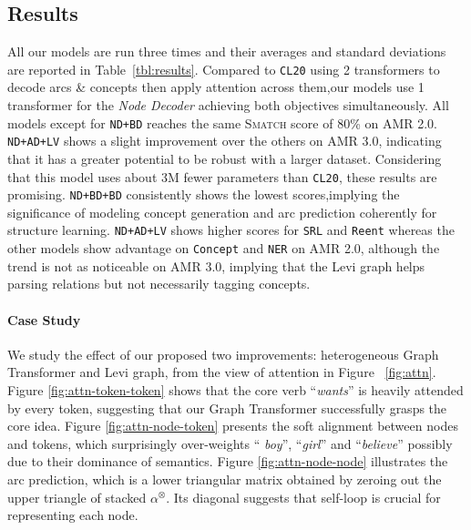 \documentclass[11pt,a4paper]{article}
\newcommand{\LN}{\linebreak\noindent}    \newcommand{\textsec}[1]{\textsection\ref{#1}}
\begin{document}
\subsection{Results}



All our models are run three times and their averages and standard deviations are reported in Table~\ref{tbl:results}.
Compared to \texttt{CL20} using 2 transformers to decode arcs \& concepts then apply attention across them,\LN our models use 1 transformer for the \textit{Node Decoder} achieving both objectives simultaneously.
All models except for \texttt{ND+BD} reaches the same \textsc{Smatch} score of 80\% on AMR 2.0.
\texttt{ND+AD+LV} shows a slight improvement over the others on AMR 3.0, indicating that it has a greater potential to be robust with a larger dataset.
Considering that this model uses about 3M fewer parameters than \texttt{CL20}, these results are promising.
\texttt{ND+BD+BD} consistently shows the lowest scores,\LN implying the significance of modeling concept generation and arc prediction coherently for structure learning.
\texttt{ND+AD+LV} shows higher scores for \texttt{SRL} and \texttt{Reent} whereas the other models show advantage on \texttt{Concept} and \texttt{NER} on AMR 2.0, although the trend is not as noticeable on AMR 3.0, implying that the Levi graph helps parsing relations but not necessarily tagging concepts.






\paragraph{Case Study} We study the effect of our proposed two improvements: heterogeneous Graph Transformer and Levi graph, from the view of attention in Figure ~\ref{fig:attn}. Figure \ref{fig:attn-token-token} shows that the core verb ``\textit{wants}'' is heavily attended by every token, suggesting that our Graph Transformer successfully grasps the core idea. Figure \ref{fig:attn-node-token} presents the soft alignment between nodes and tokens, which surprisingly over-weights ``\textit{ boy}'', ``\textit{girl}'' and ``\textit{believe}'' possibly due to their dominance of semantics. Figure \ref{fig:attn-node-node} illustrates the arc prediction, which is a lower triangular matrix obtained by zeroing out the upper triangle of stacked $\alpha^\otimes$. Its diagonal suggests that self-loop is crucial for representing each node.
\end{document}
